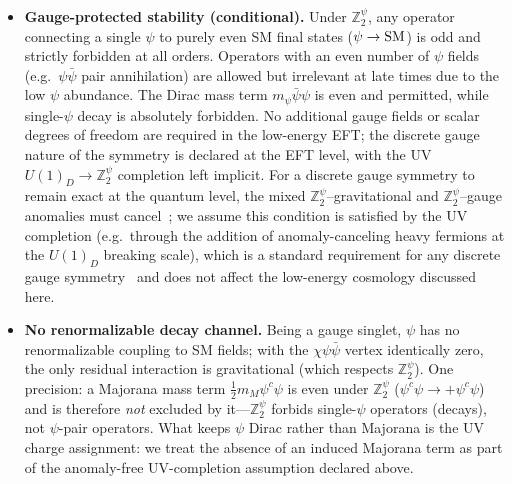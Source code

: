 \documentclass[pdflatex,sn-mathphys-num]{sn-jnl}
\newcommand{\Ztwo}{\mathbb{Z}_2}
\newcommand{\Ztwopsi}{\Ztwo^{\psi}}
\theoremstyle{thmstyleone}
\begin{document}
\begin{itemize}
\item \textbf{Gauge-protected stability (conditional).} Under $\Ztwopsi$, any operator connecting a single $\psi$ to purely even SM final states ($\psi\to{\rm SM}$) is odd and strictly forbidden at all orders. Operators with an even number of $\psi$ fields (e.g.\ $\psi\bar\psi$ pair annihilation) are allowed but irrelevant at late times due to the low $\psi$ abundance. The Dirac mass term $m_\psi\bar\psi\psi$ is even and permitted, while single-$\psi$ decay is absolutely forbidden. No additional gauge fields or scalar degrees of freedom are required in the low-energy EFT; the discrete gauge nature of the symmetry is declared at the EFT level, with the UV $U(1)_D\to\Ztwopsi$ completion left implicit. For a discrete gauge symmetry to remain exact at the quantum level, the mixed $\Ztwopsi$--gravitational and $\Ztwopsi$--gauge anomalies must cancel~\cite{IbanezRoss1991,BanksDine1992}; we assume this condition is satisfied by the UV completion (e.g.\ through the addition of anomaly-canceling heavy fermions at the $U(1)_D$ breaking scale), which is a standard requirement for any discrete gauge symmetry~\cite{KraussWilczek1989} and does not affect the low-energy cosmology discussed here.

\item \textbf{No renormalizable decay channel.} Being a gauge singlet, $\psi$ has no renormalizable coupling to SM fields; with the $\chi\psi\bar\psi$ vertex identically zero, the only residual interaction is gravitational (which respects $\Ztwopsi$). One precision: a Majorana mass term $\frac12 m_M\psi^c\psi$ is even under $\Ztwopsi$ ($\psi^c\psi\to+\psi^c\psi$) and is therefore \emph{not} excluded by it---$\Ztwopsi$ forbids single-$\psi$ operators (decays), not $\psi$-pair operators. What keeps $\psi$ Dirac rather than Majorana is the UV charge assignment: we treat the absence of an induced Majorana term as part of the anomaly-free UV-completion assumption declared above.
\end{itemize}
\end{document}
